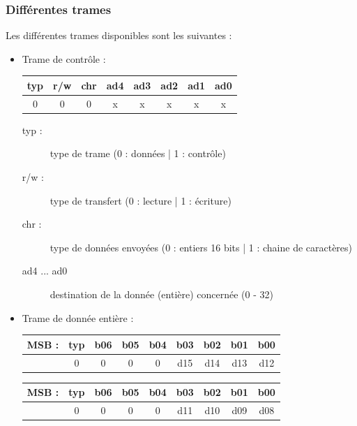 \documentclass[11pt, french]{article} %
\begin{document}
\subsubsection{Différentes trames}
\noindent
Les différentes trames disponibles sont les suivantes :
\medskip
\begin{itemize}
	\item Trame de contrôle : \\

		\begin{tabular} {|c|c|c|c|c|c|c|c|}
			\hline
			\textbf{typ} & \textbf{r/w} & \textbf{chr} & \textbf{ad4} & \textbf{ad3} & \textbf{ad2} & \textbf{ad1} & \textbf{ad0}\\
			\hline
			0 & 0 &  0 &  x &  x &  x &  x &  x \\ \hline
		\end{tabular}

		\begin{description}
			\item[typ :] type de trame (0 : données | 1 : contrôle)
			\item[r/w :] type de transfert (0 : lecture | 1 : écriture)
			\item[chr :] type de données envoyées (0 : entiers 16 bits | 1 : chaine de caractères)
			\item[ad4 ... ad0] destination de la donnée (entière) concernée (0 - 32)
		\end{description}

	\medskip
	\item Trame de donnée entière : \\

		\begin{tabular} {|c|c|c|c|c|c|c|c|c|}
			\hline
			\textbf{MSB :} & \textbf{typ} & \textbf{b06} & \textbf{b05} & \textbf{b04} & \textbf{b03} & \textbf{b02} & \textbf{b01} & \textbf{b00}\\
			\hline
			 & 0 & 0 &  0 &  0 &  d15 &  d14 &  d13 &  d12 \\ \hline
		\end{tabular}

		\begin{tabular} {|c|c|c|c|c|c|c|c|c|}
			\hline
			\textbf{MSB :} & \textbf{typ} & \textbf{b06} & \textbf{b05} & \textbf{b04} & \textbf{b03} & \textbf{b02} & \textbf{b01} & \textbf{b00}\\
			\hline
			 & 0 & 0 &  0 &  0 &  d11 &  d10 &  d09 &  d08 \\ \hline
		\end{tabular}


\end{itemize}
\end{document}
